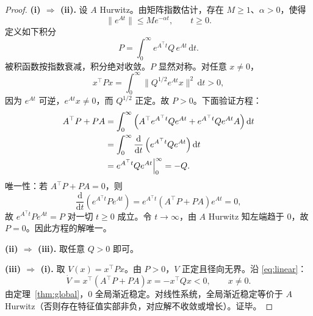 \documentclass[11pt, a4paper, UTF8, fontset=none]{ctexart}
\theoremstyle{cnthm}
\newcommand{\norm}[1]{\lVert #1\rVert}
\begin{document}
\begin{proof}
\textbf{(i) $\Rightarrow$ (ii).} 设 $A$ Hurwitz。由矩阵指数估计，存在 $M\ge1$、$\alpha>0$，使得
\begin{equation}
  \norm{e^{At}}\le Me^{-\alpha t},\qquad t\ge0.
\end{equation}
定义如下积分
\begin{equation}
  P=\int_0^\infty e^{A^\top t}Q\,e^{At}\,\mathrm{d}t.
  \label{eq:P-integral}
\end{equation}
被积函数按指数衰减，积分绝对收敛。$P$ 显然对称。对任意 $x\ne0$，
\begin{equation}
  x^\top Px=\int_0^\infty \norm{Q^{1/2}e^{At}x}^2\,\mathrm{d}t>0,
\end{equation}
因为 $e^{At}$ 可逆，$e^{At}x\ne0$，而 $Q^{1/2}$ 正定。故 $P>0$。下面验证方程：
\begin{align}
  A^\top P+PA
  &=\int_0^\infty\left(A^\top e^{A^\top t}Qe^{At}+e^{A^\top t}Qe^{At}A\right)\mathrm{d}t \notag\\
  &=\int_0^\infty\frac{\mathrm{d}}{\mathrm{d}t}\left(e^{A^\top t}Qe^{At}\right)\mathrm{d}t \notag\\
  &=e^{A^\top t}Qe^{At}\Big|_{0}^{\infty}=-Q.
\end{align}
唯一性：若 $A^\top P+PA=0$，则
\begin{equation}
  \frac{\mathrm{d}}{\mathrm{d}t}\left(e^{A^\top t}Pe^{At}\right)
  =e^{A^\top t}(A^\top P+PA)e^{At}=0,
\end{equation}
故 $e^{A^\top t}Pe^{At}=P$ 对一切 $t\ge0$ 成立。令 $t\to\infty$，由 $A$ Hurwitz 知左端趋于 $0$，故 $P=0$。因此方程的解唯一。

\textbf{(ii) $\Rightarrow$ (iii).} 取任意 $Q>0$ 即可。

\textbf{(iii) $\Rightarrow$ (i).} 取 $V(x)=x^\top Px$。由 $P>0$，$V$ 正定且径向无界。沿 \eqref{eq:linear}：
\begin{equation}
  \dot V=x^\top(A^\top P+PA)x=-x^\top Qx<0,\qquad x\ne0.
\end{equation}
由定理~\ref{thm:global}，$0$ 全局渐近稳定。对线性系统，全局渐近稳定等价于 $A$ Hurwitz（否则存在特征值实部非负，对应解不收敛或增长）。证毕。
\end{proof}
\end{document}
